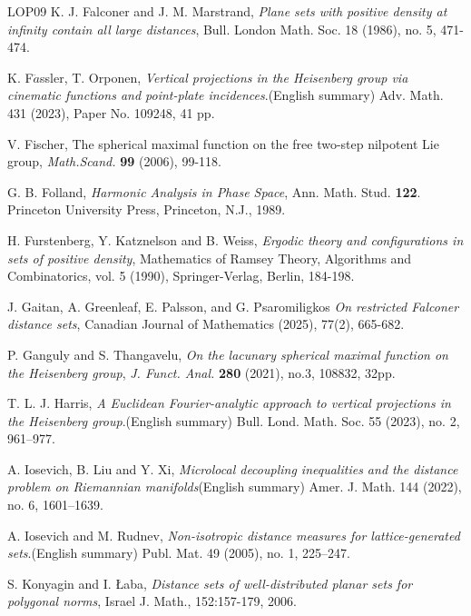 \documentclass[11pt, reqno]{amsart}
\theoremstyle{plain}
\theoremstyle{remark}
\theoremstyle{example}
\theoremstyle{definition}
\numberwithin{equation}{section}
\begin{document}
\begin{thebibliography}{LOP{\etalchar{+}}09}
 K. J. Falconer and J. M. Marstrand, \textit{Plane sets with positive density at infinity contain all large distances}, Bull. London Math. Soc. 18 (1986), no. 5, 471-474.

 K. F$\ddot{a}$ssler, T. Orponen, \textit{Vertical projections in the Heisenberg group via cinematic functions and point-plate incidences}.(English summary) Adv. Math. 431 (2023), Paper No. 109248, 41 pp.

 V. Fischer, {The spherical maximal function on the free two-step nilpotent Lie group}, \textit{Math.Scand.} \textbf{99} (2006), 99-118.

  G. B. Folland, \emph{Harmonic Analysis in Phase Space}, Ann. Math. Stud. {\bf 122}. Princeton University Press, Princeton, N.J., 1989.

 H. Furstenberg, Y. Katznelson and B. Weiss, \textit{Ergodic theory and configurations in sets of positive density}, Mathematics of Ramsey Theory, Algorithms and Combinatorics, vol. 5 (1990), Springer-Verlag, Berlin, 184-198.

 J. Gaitan, A. Greenleaf, E. Palsson, and G. Psaromiligkos \textit{On restricted Falconer distance sets}, Canadian Journal of Mathematics (2025), 77(2), 665-682.

 {P. Ganguly and S. Thangavelu,}
 \emph{On the lacunary spherical maximal function on the Heisenberg group},
\textit{J. Funct. Anal.} \textbf{280} (2021), no.3, 108832, 32pp.




 T. L. J. Harris, \textit{A Euclidean Fourier-analytic approach to vertical projections in the Heisenberg group}.(English summary) Bull. Lond. Math. Soc. 55 (2023), no. 2, 961–977.

 A. Iosevich, B. Liu and Y. Xi, \textit{Microlocal decoupling inequalities and the distance problem on Riemannian manifolds}(English summary) Amer. J. Math. 144 (2022), no. 6, 1601–1639.

 A. Iosevich and M. Rudnev, \textit{Non-isotropic distance measures for lattice-generated sets}.(English summary) Publ. Mat. 49 (2005), no. 1, 225–247.

 S. Konyagin and I. Łaba, \textit{Distance sets of well-distributed planar sets for polygonal norms}, Israel J. Math., 152:157-179, 2006.


\end{thebibliography}
\end{document}
